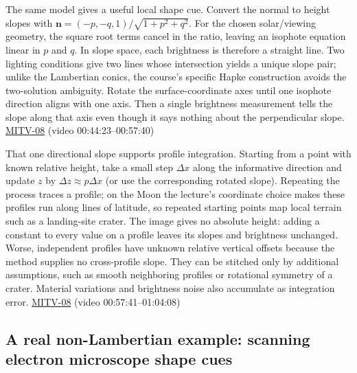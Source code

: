 The same model gives a useful local shape cue. Convert the normal to height slopes with \(\mathbf n=(-p,-q,1)/\sqrt{1+p^2+q^2}\). For the chosen solar/viewing geometry, the square root terms cancel in the ratio, leaving an isophote equation linear in \(p\) and \(q\). In slope space, each brightness is therefore a straight line. Two lighting conditions give two lines whose intersection yields a unique slope pair; unlike the Lambertian conics, the course's specific Hapke construction avoids the two-solution ambiguity. Rotate the surface-coordinate axes until one isophote direction aligns with one axis. Then a single brightness measurement tells the slope along that axis even though it says nothing about the perpendicular slope. \hyperref[04-visual-computing-ii-ch036-mitv-08---shading-special-cases-lunar-surface-scanning-electron-microscope-greens-theorem]{MITV-08} (video 00:44:23--00:57:40)

That one directional slope supports profile integration. Starting from a point with known relative height, take a small step \(\Delta x\) along the informative direction and update \(z\) by \(\Delta z\approx p\Delta x\) (or use the corresponding rotated slope). Repeating the process traces a profile; on the Moon the lecture's coordinate choice makes these profiles run along lines of latitude, so repeated starting points map local terrain such as a landing-site crater. The image gives no absolute height: adding a constant to every value on a profile leaves its slopes and brightness unchanged. Worse, independent profiles have unknown relative vertical offsets because the method supplies no cross-profile slope. They can be stitched only by additional assumptions, such as smooth neighboring profiles or rotational symmetry of a crater. Material variations and brightness noise also accumulate as integration error. \hyperref[04-visual-computing-ii-ch036-mitv-08---shading-special-cases-lunar-surface-scanning-electron-microscope-greens-theorem]{MITV-08} (video 00:57:41--01:04:08)

\subsection{A real non-Lambertian example: scanning electron microscope shape cues}\label{04-visual-computing-ii-ch032-a-real-non-lambertian-example-scanning-electron-microscope-shape-cues}

